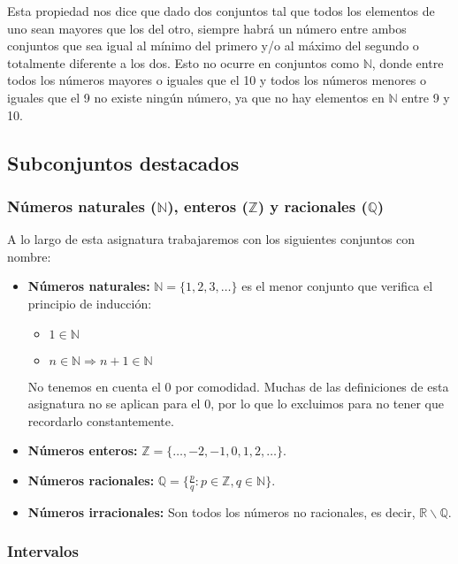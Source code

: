 Esta propiedad nos dice que dado dos conjuntos tal que todos los elementos de uno sean mayores que los del otro, siempre habrá un número entre ambos conjuntos que sea igual al mínimo del primero y/o al máximo del segundo o totalmente diferente a los dos.
Esto no ocurre en conjuntos como $\mathbb{N}$, donde entre todos los números mayores o iguales que el 10 y todos los números menores o iguales que el 9 no existe ningún número, ya que no hay elementos en $\mathbb{N}$ entre 9 y 10.

\subsection{Subconjuntos destacados}

\subsubsection{Números naturales ($\mathbb{N}$), enteros ($\mathbb{Z}$) y racionales ($\mathbb{Q}$)}

A lo largo de esta asignatura trabajaremos con los siguientes conjuntos con nombre:

\begin{itemize}
	\item\textbf{Números naturales:}
		$\mathbb{N} = \{1, 2, 3, \ldots\}$ es el menor conjunto que verifica el principio de inducción:
		\begin{itemize}
			\item $1 \in\mathbb{N}$
			\item $n \in\mathbb{N} \Rightarrow n + 1 \in\mathbb{N}$
		\end{itemize}
		No tenemos en cuenta el 0 por comodidad.
		Muchas de las definiciones de esta asignatura no se aplican para el 0, por lo que lo excluimos para no tener que recordarlo constantemente.
	\item\textbf{Números enteros:}
		$\mathbb{Z} = \{\ldots, -2, -1, 0, 1, 2, \ldots\}$.
	\item\textbf{Números racionales:}
		$\mathbb{Q} = \big\{\frac{p}{q} : p \in\mathbb{Z}, q \in\mathbb{N}\big\}$.
	\item\textbf{Números irracionales:}
		Son todos los números no racionales, es decir, $\mathbb{R}\backslash\mathbb{Q}$.
\end{itemize}

\subsubsection{Intervalos}

